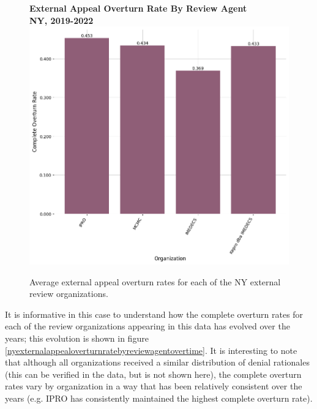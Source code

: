 \documentclass[12pt, a4paper,twoside,parskip=full]{report}
\theoremstyle{plain} %
\theoremstyle{definition} %
\theoremstyle{remark} %
\numberwithin{equation}{chapter}
\begin{document}
		\begin{figure}[h!]
			\centering
			\textbf{External Appeal Overturn Rate By Review Agent}\\
			\textbf{NY, 2019-2022}\\
			\includegraphics[width=.8\textwidth]{images/nys_external/external_appeal_overturn_rates_by_agent.png}
			\caption{Average external appeal overturn rates for each of the NY external review organizations.}
			\label{nyexternalappealoverturnratebyreviewagent}
		\end{figure}
	
		\clearpage
		
		It is informative in this case to understand how the complete overturn rates for each of the review organizations appearing in this data has evolved over the years; this evolution is shown in figure \ref{nyexternalappealoverturnratebyreviewagentovertime}. It is interesting to note that although all organizations received a similar distribution of denial rationales (this can be verified in the data, but is not shown here), the complete overturn rates vary by organization in a way that has been relatively consistent over the years (e.g. IPRO has consistently maintained the highest complete overturn rate).
		
\end{document}
